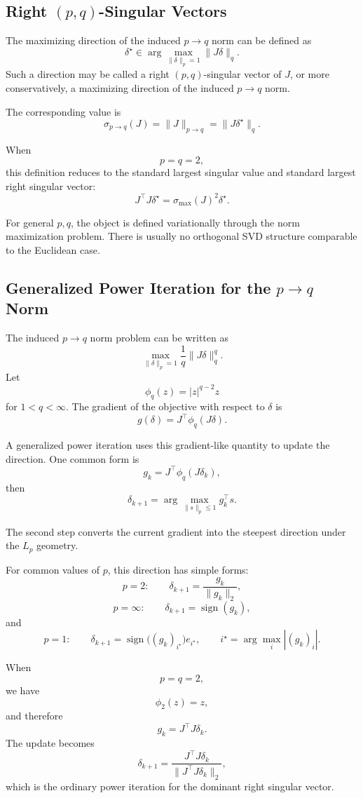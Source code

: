 \documentclass{article}
\begin{document}
\subsection{Right $(p,q)$-Singular Vectors}

The maximizing direction of the induced $p\to q$ norm can be defined as
\[
\delta^\star
\in
\arg\max_{\|\delta\|_p=1}
\|J\delta\|_q.
\]
Such a direction may be called a right $(p,q)$-singular vector of $J$, or more conservatively, a maximizing direction of the induced $p\to q$ norm.

The corresponding value is
\[
\sigma_{p\to q}(J)
=
\|J\|_{p\to q}
=
\|J\delta^\star\|_q.
\]

When
\[
p=q=2,
\]
this definition reduces to the standard largest singular value and standard largest right singular vector:
\[
J^\top J\delta^\star
=
\sigma_{\max}(J)^2 \delta^\star.
\]

For general $p,q$, the object is defined variationally through the norm maximization problem. There is usually no orthogonal SVD structure comparable to the Euclidean case.

\subsection{Generalized Power Iteration for the $p\to q$ Norm}

The induced $p\to q$ norm problem can be written as
\[
\max_{\|\delta\|_p=1}
\frac{1}{q}\|J\delta\|_q^q.
\]
Let
\[
\phi_q(z)=|z|^{q-2}z
\]
for $1<q<\infty$. The gradient of the objective with respect to $\delta$ is
\[
g(\delta)
=
J^\top \phi_q(J\delta).
\]

A generalized power iteration uses this gradient-like quantity to update the direction. One common form is
\[
g_k
=
J^\top \phi_q(J\delta_k),
\]
then
\[
\delta_{k+1}
=
\arg\max_{\|s\|_p\le 1}
g_k^\top s.
\]

The second step converts the current gradient into the steepest direction under the $L_p$ geometry.

For common values of $p$, this direction has simple forms:
\[
p=2:
\qquad
\delta_{k+1}
=
\frac{g_k}{\|g_k\|_2},
\]
\[
p=\infty:
\qquad
\delta_{k+1}
=
\operatorname{sign}(g_k),
\]
and
\[
p=1:
\qquad
\delta_{k+1}
=
\operatorname{sign}\bigl((g_k)_{i^\star}\bigr)e_{i^\star},
\qquad
i^\star=\arg\max_i |(g_k)_i|.
\]

When
\[
p=q=2,
\]
we have
\[
\phi_2(z)=z,
\]
and therefore
\[
g_k
=
J^\top J\delta_k.
\]
The update becomes
\[
\delta_{k+1}
=
\frac{J^\top J\delta_k}
{\|J^\top J\delta_k\|_2},
\]
which is the ordinary power iteration for the dominant right singular vector.
\end{document}
